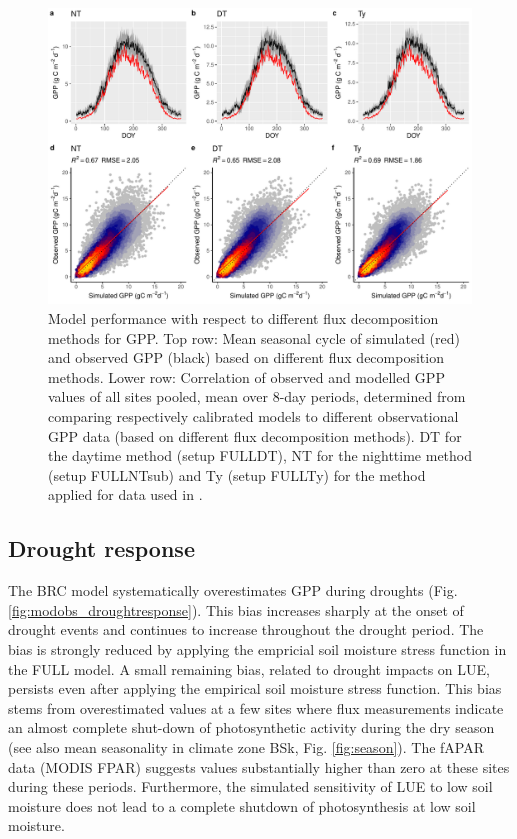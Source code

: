 \documentclass[gmd, manuscript]{copernicus}
\begin{document}
 \begin{figure}[t]
\includegraphics[width=12cm]{fig/meandoy_modobs_gpp_data.pdf}
    \caption{Model performance with respect to different flux decomposition methods for GPP. Top row: Mean seasonal cycle of simulated (red) and observed GPP (black) based on different flux decomposition methods. Lower row: Correlation of observed and modelled GPP values of all sites pooled, mean over 8-day periods, determined from comparing respectively calibrated models to different observational GPP data (based on different flux decomposition methods). DT for the daytime method (setup FULL\textunderscore DT), NT for the nighttime method (setup FULL\textunderscore NTsub) and Ty (setup FULL\textunderscore Ty) for the method applied for data used in \citet{wang17rs}.}
    \label{fig:season3}
\end{figure}


\subsection{Drought response}
\label{sec:results_droughtresponse}

The BRC model systematically overestimates GPP during droughts (Fig. \ref{fig:modobs_droughtresponse}). This bias increases sharply at the onset of drought events and continues to increase throughout the drought period. The bias is strongly reduced by applying the empricial soil moisture stress function in the FULL model. A small remaining bias, related to drought impacts on LUE, persists even after applying the empirical soil moisture stress function. This bias stems from overestimated values at a few sites where flux measurements indicate an almost complete shut-down of photosynthetic activity during the dry season (see also mean seasonality in climate zone BSk, Fig. \ref{fig:season}). The fAPAR data (MODIS FPAR) suggests values substantially higher than zero at these sites during these periods. Furthermore, the simulated sensitivity of LUE to low soil moisture does not lead to a complete shutdown of photosynthesis at low soil moisture.
\end{document}
